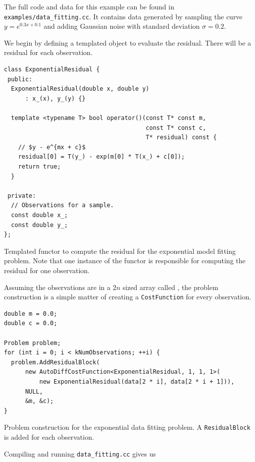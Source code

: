 The full code and data for this example can be found in
\texttt{examples/data\_fitting.cc}. It contains data generated by sampling the curve $y = e^{0.3x + 0.1}$ and adding Gaussian noise with standard deviation $\sigma = 0.2$.

We begin by defining a templated object to evaluate the residual. There will be a residual for each observation.

\begin{listing}[H]
\begin{verbatim}
class ExponentialResidual {
 public:
  ExponentialResidual(double x, double y)
      : x_(x), y_(y) {}

  template <typename T> bool operator()(const T* const m,
                                        const T* const c,
                                        T* residual) const {
    // $y - e^{mx + c}$
    residual[0] = T(y_) - exp(m[0] * T(x_) + c[0]);
    return true;
  }

 private:
  // Observations for a sample.
  const double x_;
  const double y_;
};
\end{verbatim}
\caption{Templated functor to compute the residual for the exponential model fitting problem. Note that one instance of the functor is responsible for computing the residual for one observation.}
\label{listing:exponentialresidual}
\end{listing}
Assuming the observations are in a $2n$ sized array called , the problem construction is a simple matter of creating a \texttt{CostFunction} for every observation.
\begin{listing}[H]
\begin{verbatim}
double m = 0.0;
double c = 0.0;

Problem problem;
for (int i = 0; i < kNumObservations; ++i) {
  problem.AddResidualBlock(
      new AutoDiffCostFunction<ExponentialResidual, 1, 1, 1>(
          new ExponentialResidual(data[2 * i], data[2 * i + 1])),
      NULL,
      &m, &c);
}
\end{verbatim}
\caption{Problem construction for the exponential data fitting problem. A \texttt{ResidualBlock} is added for each observation.}
\label{listing:datafitting}
\end{listing}
Compiling and running \texttt{data\_fitting.cc} gives us
